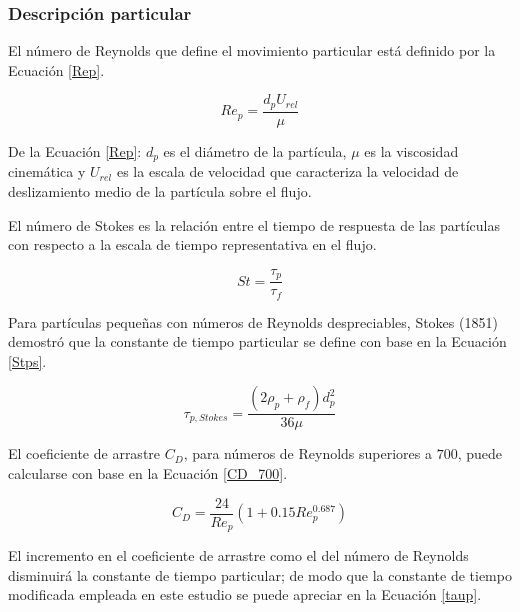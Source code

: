 \subsubsection{Descripci\'on particular}

\noindent
\justify

El n\'umero de Reynolds que define el movimiento particular est\'a definido por la Ecuaci\'on \ref{Rep}.

\begin{equation}
	Re_p = \frac{d_p U_{rel}}{\mu}
	\label{Rep}
\end{equation}

\noindent
\justify

De la Ecuaci\'on \ref{Rep}: $d_p$ es el di\'ametro de la part\'icula, $\mu$ es la viscosidad cinem\'atica y $U_{rel}$ es la escala de velocidad que caracteriza la velocidad de deslizamiento medio de la part\'icula sobre el flujo.

\noindent
\justify

El n\'umero de Stokes es la relaci\'on entre el tiempo de respuesta de las part\'iculas con respecto a la escala de tiempo representativa en el flujo.

\begin{equation}
	St = \frac{\tau _p}{\tau _f}
	\label{Stp}
\end{equation}

\noindent
\justify

Para part\'iculas peque\~nas con n\'umeros de Reynolds despreciables, Stokes (1851) demostr\'o que la constante de tiempo particular se define con base en la Ecuaci\'on \ref{Stps}.

\begin{equation}
	\tau _{p, Stokes} = \frac{\left(2 \rho _p + \rho _f \right) d_p ^2}{36 \mu}
	\label{Stps}
\end{equation}

\noindent
\justify

El coeficiente de arrastre $C_D$, para n\'umeros de Reynolds superiores a $700$, puede calcularse con base en la Ecuaci\'on \ref{CD_700}.

\begin{equation}
	C_D = \frac{24}{Re_p} \left(1 + 0.15 Re_p ^{0.687} \right)
	\label{CD_700}
\end{equation}

\noindent
\justify

El incremento en el coeficiente de arrastre como el del n\'umero de Reynolds disminuir\'a la constante de tiempo particular; de modo que la constante de tiempo modificada empleada en este estudio se puede apreciar en la Ecuaci\'on \ref{taup}.

